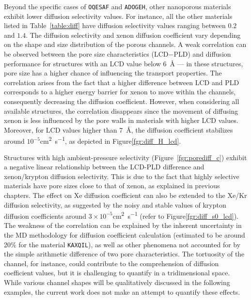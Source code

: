 \documentclass[main]{subfiles}
\begin{document}
Beyond the specific cases of \texttt{OQESAF} and \texttt{ADOGEH}, other nanoporous materials exhibit lower diffusion selectivity values. For instance, all the other materials listed in Table~\ref{table:diff} have diffusion selectivity values ranging between $0.2$ and $1.4$. The diffusion selectivity and xenon diffusion coefficient vary depending on the shape and size distribution of the porous channels. A weak correlation can be observed between the pore size characteristics (LCD$-$PLD) and diffusion performance for structures with an LCD value below \SI{6}{\angstrom} --- in these structures, pore size has a higher chance of influencing the transport properties. The correlation arises from the fact that a higher difference between LCD and PLD corresponds to a higher energy barrier for xenon to move within the channels, consequently decreasing the diffusion coefficient. However, when considering all available structures, the correlation disappears since the movement of diffusing xenon is less influenced by the pore walls in materials with higher LCD values. Moreover, for LCD values higher than \SI{7}{\angstrom}, the diffusion coefficient stabilizes around $10^{-5}$\si{\square\cm\per\s}, as depicted in Figure\ref{fgr:diff_H_lcd}. 

Structures with high ambient-pressure selectivity (Figure~\ref{fgr:porediff_c}) exhibit a negative linear relationship between the LCD-PLD difference and xenon/krypton diffusion selectivity. This is due to the fact that highly selective materials have pore sizes close to that of xenon, as explained in previous chapters. The effect on Xe diffusion coefficient can also be extended to the Xe/Kr diffusion selectivity, as suggested by the noisy and stable values of krypton diffusion coefficients around $3\times10^{-5}$\si{\square\cm\per\s} (refer to Figure\ref{fgr:diff_s0_lcd}). The weakness of the correlation can be explained by the inherent uncertainty in the MD methodology for diffusion coefficient calculation (estimated to be around {20\%} for the material \texttt{KAXQIL}), as well as other phenomena not accounted for by the simple arithmetic difference of two pore characteristics. The tortuosity of the channel, for instance, could contribute to the comprehension of diffusion coefficient values, but it is challenging to quantify in a tridimensional space. While various channel shapes will be qualitatively discussed in the following examples, the current work does not make an attempt to quantify these effects.
\end{document}
